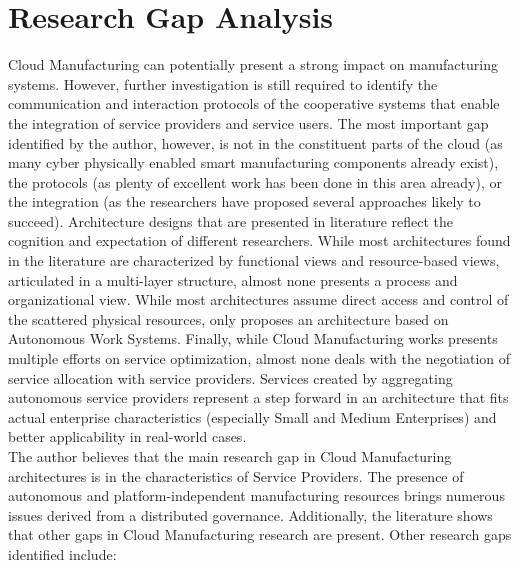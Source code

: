 \section{Research Gap Analysis}
Cloud Manufacturing can potentially present a strong impact on manufacturing systems. However, further investigation is still required to identify the communication and interaction protocols of the cooperative systems that enable the integration of service providers and service users. The most important gap identified by the author, however, is not in the constituent parts of the cloud (as many cyber physically enabled smart manufacturing components already exist), the protocols (as plenty of excellent work has been done in this area already), or the integration (as the researchers have proposed several approaches likely to succeed). Architecture designs that are presented in literature reflect the cognition and expectation of different researchers. While most architectures found in the literature are characterized by functional views and resource-based views, articulated in a multi-layer structure, almost none presents a process and organizational view. While most architectures assume direct access and control of the scattered physical resources, only \textcite{skulj_decentralised_2015} proposes an architecture based on Autonomous Work Systems. Finally, while Cloud Manufacturing works presents multiple efforts on service optimization, almost none deals with the negotiation of service allocation with service providers. Services created by aggregating autonomous service providers represent a step forward in an architecture that fits actual enterprise characteristics (especially Small and Medium Enterprises) and better applicability in real-world cases.\\
The author believes that the main research gap in Cloud Manufacturing architectures is in the characteristics of Service Providers. The presence of autonomous and platform-independent manufacturing resources brings numerous issues derived from a distributed governance. Additionally, the literature shows that other gaps in Cloud Manufacturing research are present. Other research gaps identified include:
